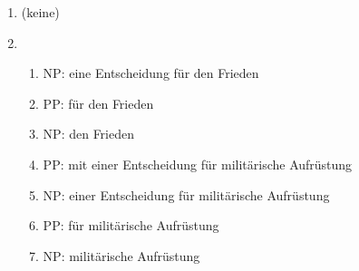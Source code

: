 {\begin{enumerate}
\begin{enumerate}
        \item NP: der Hund unter dem Tisch
        \item PP: unter dem Tisch
        \item NP: dem Tisch
        \item NP: sein Fressen
      \end{enumerate}
    \item (keine)
    \item 
      \begin{enumerate}
        \item NP: eine Entscheidung für den Frieden
        \item PP: für den Frieden
        \item NP: den Frieden
        \item PP: mit einer Entscheidung für militärische Aufrüstung
        \item NP: einer Entscheidung für militärische Aufrüstung
        \item PP: für militärische Aufrüstung
        \item NP: militärische Aufrüstung
      \end{enumerate}
  \end{enumerate}
}
